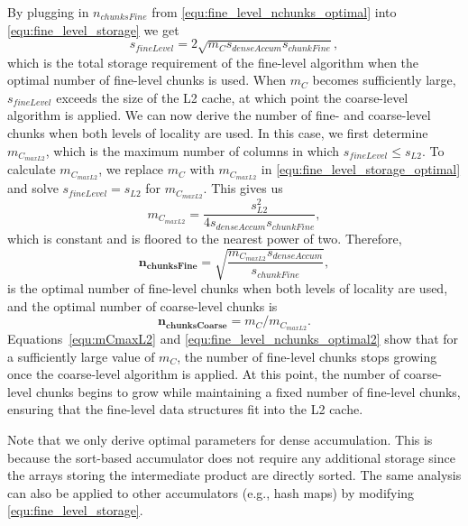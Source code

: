 By plugging in $n_{chunksFine}$ from \autoref{equ:fine_level_nchunks_optimal} into \autoref{equ:fine_level_storage} we get
\begin{equation}
s_{fineLevel}=2\sqrt{m_C s_{denseAccum} s_{chunkFine}},
\label{equ:fine_level_storage_optimal}
\end{equation}
which is the total storage requirement of the fine-level algorithm when the optimal number of fine-level chunks is used.
When $m_C$ becomes sufficiently large, $s_{fineLevel}$ exceeds the size of the L2 cache, at which point the coarse-level algorithm is applied.
We can now derive the number of fine- and coarse-level chunks when both levels of locality are used.
In this case, we first determine $m_{C_{maxL2}}$, which is the maximum number of columns in which $s_{fineLevel} \leq s_{L2}$.
To calculate $m_{C_{maxL2}}$, we replace $m_C$ with $m_{C_{maxL2}}$ in \autoref{equ:fine_level_storage_optimal} and solve $s_{fineLevel}=s_{L2}$ for $m_{C_{maxL2}}$.
This gives us
\begin{equation}
m_{C_{maxL2}} = \frac{s_{L2}^2}{4  s_{denseAccum}   s_{chunkFine}},
\label{equ:mCmaxL2}
\end{equation}
which is constant and is floored to the nearest power of two.
Therefore,
\begin{equation}
\boldsymbol{n_{chunksFine}}=\sqrt{\frac{m_{C_{maxL2}} s_{denseAccum}}{s_{chunkFine}}},
\label{equ:fine_level_nchunks_optimal2}
\end{equation}
is the optimal number of fine-level chunks when both levels of locality are used, and
the optimal number of coarse-level chunks is
\begin{equation}
\boldsymbol{n_{chunksCoarse}}=m_C / m_{C_{maxL2}}.
\label{equ:coarse_level_nchunks_optimal}
\end{equation}
Equations~\ref{equ:mCmaxL2} and \ref{equ:fine_level_nchunks_optimal2} show that for a sufficiently large value of $m_C$, the number of fine-level chunks stops growing once the coarse-level algorithm is applied.
At this point, the number of coarse-level chunks begins to grow while maintaining a fixed number of fine-level chunks, ensuring that the fine-level data structures fit into the L2 cache.

Note that we only derive optimal parameters for dense accumulation.
This is because the sort-based accumulator does not require any additional storage since
the arrays storing the intermediate product are directly sorted.
The same analysis can also be applied to other accumulators (e.g., hash maps) by modifying \autoref{equ:fine_level_storage}.